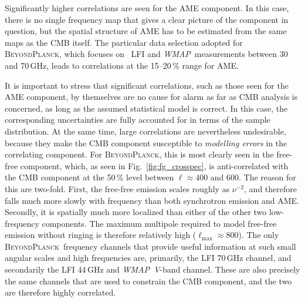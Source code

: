 \documentclass[twocolumn]{aa}
\def\WMAP{\textit{WMAP}}
\newcommand{\BP}{\textsc{BeyondPlanck}}
\begin{document}
Significantly higher correlations are seen for the AME component. In
this case, there is no single frequency map that gives a clear picture
of the component in question, but the spatial structure of AME has to
be estimated from the same maps as the CMB itself. The particular data
selection adopted for \BP, which focuses on \Planck\ LFI and
\WMAP\ measurements between 30 and 70\,GHz, leads to correlations at
the 15--20\,\% range for AME.

It is important to stress that significant correlations, such as those
seen for the AME component, by themselves are no cause for alarm as
far as CMB analysis is concerned, as long as the assumed statistical
model is correct. In this case, the corresponding uncertainties are
fully accounted for in terms of the sample distribution. At the same
time, large correlations are nevertheless undesirable, because they
make the CMB component susceptible to \emph{modelling errors} in the
correlating component. For \BP, this is most clearly seen in the
free-free component, which, as seen in Fig.~\ref{fig:fg_crosspec}, is
anti-correlated with the CMB component at the 50\,\% level between
$\ell\approx400$ and 600. The reason for this are two-fold. First, the
free-free emission scales roughly as $\nu^{-2}$, and therefore falls
much more slowly with frequency than both synchrotron emission and
AME. Secondly, it is spatially much more localized than either of the
other two low-frequency components. The maximum multipole required to
model free-free emission without ringing is therefore relatively high
($\ell_{\mathrm{max}}\approx800$). The only \BP\ frequency channels
that provide useful information at such small angular scales and high
frequencies are, primarily, the LFI 70\,GHz channel, and secondarily
the LFI 44\,GHz and \WMAP\ \textit V-band channel. These are also precisely
the same channels that are used to constrain the CMB component, and
the two are therefore highly correlated.
\end{document}
